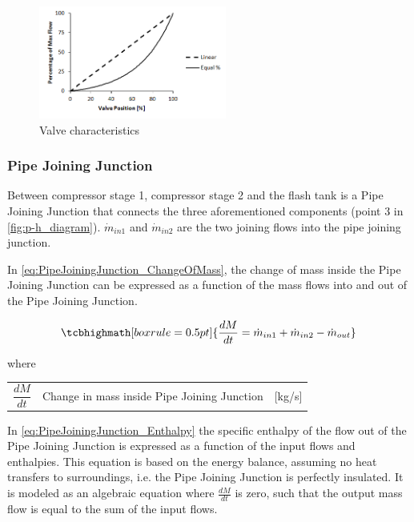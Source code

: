 \begin{figure}[h!]
	\centering
	\includegraphics[width=0.55\textwidth]{Graphics/Equal-percentage.png}
	\caption{Valve characteristics}
	\label{fig:equal_percent_valve}
\end{figure}

\newpage

\subsubsection{Pipe Joining Junction}\label{sec:pipe-joining-junction}
Between compressor stage 1, compressor stage 2 and the flash tank is a Pipe Joining Junction that connects the three aforementioned components (point 3 in \cref{fig:p-h_diagram}). $\dot{m}_{in1}$ and $\dot{m}_{in2}$ are the two joining flows into the pipe joining junction.

In \cref{eq:PipeJoiningJunction_ChangeOfMass}, the change of mass inside the Pipe Joining Junction can be expressed as a function of the mass flows into and out of the Pipe Joining Junction.


\begin{equation}
	\tcbhighmath[boxrule = 0.5pt]{ \frac{dM}{dt} = \dot{m}_{in1} + \dot{m}_{in2} - \dot{m}_{out} }       \label{eq:PipeJoiningJunction_ChangeOfMass}
\end{equation}

where

\begin{center}
	\begin{tabular}{l p{8cm} l}
		$\dfrac{dM}{dt}$ & Change in mass inside Pipe Joining Junction             & [\si{kg}/\si{s}] \\
	\end{tabular}
\end{center}

In \cref{eq:PipeJoiningJunction_Enthalpy} the specific enthalpy of the flow out of the Pipe Joining Junction is expressed as a function of the input flows and enthalpies. This equation is based on the energy balance, assuming no heat transfers to surroundings, i.e. the Pipe Joining Junction is perfectly insulated. It is modeled as an algebraic equation where $\frac{dM}{dt}$ is zero, such that the output mass flow is equal to the sum of the input flows.


